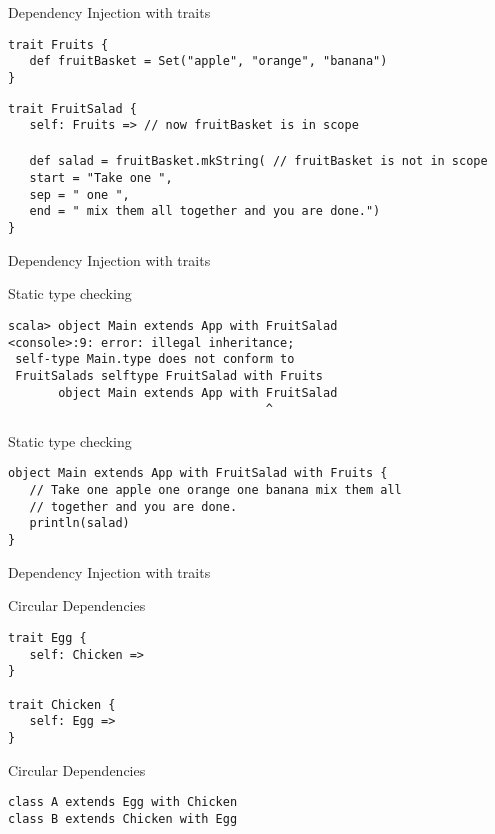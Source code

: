 \begin{frame}[fragile]{Dependency Injection with traits}
\begin{lstlisting}
trait Fruits {
   def fruitBasket = Set("apple", "orange", "banana")
}
\end{lstlisting}
\lstinline!trait FruitSalad {!\\
\lstinline!   self: Fruits => // now fruitBasket is in scope!\\
\lstinline!!\\  
\lstinline!   def salad = fruitBasket.mkString( // fruitBasket is not in scope!\\
\lstinline!   start = "Take one ",!\\
\lstinline!   sep = " one ",!\\
\lstinline!   end = " mix them all together and you are done.")!\\
\lstinline!}!
\end{frame}

\begin{frame}[fragile]{Dependency Injection with traits}
\begin{alertblock}{Static type checking}
\begin{lstlisting}
scala> object Main extends App with FruitSalad
<console>:9: error: illegal inheritance;
 self-type Main.type does not conform to 
 FruitSalads selftype FruitSalad with Fruits
       object Main extends App with FruitSalad
                                    ^
\end{lstlisting}
\end{alertblock}
\begin{exampleblock}{Static type checking}
\begin{lstlisting}
object Main extends App with FruitSalad with Fruits {
   // Take one apple one orange one banana mix them all
   // together and you are done.
   println(salad)
}
\end{lstlisting}
\end{exampleblock}
\end{frame}

\begin{frame}[fragile]{Dependency Injection with traits}
\begin{exampleblock}{Circular Dependencies}
\begin{lstlisting}
trait Egg {
   self: Chicken =>
}

trait Chicken {
   self: Egg =>
}
\end{lstlisting}
\end{exampleblock}
\pause
\begin{exampleblock}{Circular Dependencies}
\begin{lstlisting}
class A extends Egg with Chicken
class B extends Chicken with Egg
\end{lstlisting}
\end{exampleblock}
\end{frame}

